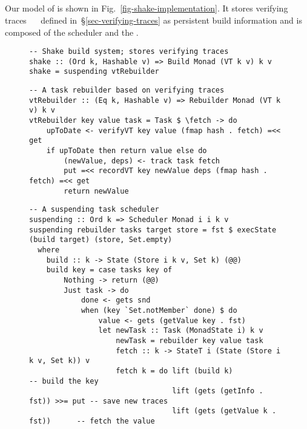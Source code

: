 \vspace{-1mm}
\subsection{\Shake}\label{sec-implementation-shake}
\vspace{-1mm}

Our model of \Shake is shown in Fig.~\ref{fig-shake-implementation}. It stores
verifying traces ~~ defined in~\S\ref{sec-verifying-traces}
as persistent build information and is composed of the  scheduler
and the .

\begin{figure}
\begin{verbatim}
-- Shake build system; stores verifying traces
shake :: (Ord k, Hashable v) => Build Monad (VT k v) k v
shake = suspending vtRebuilder
\end{verbatim}
\vspace{0mm}
\begin{verbatim}
-- A task rebuilder based on verifying traces
vtRebuilder :: (Eq k, Hashable v) => Rebuilder Monad (VT k v) k v
vtRebuilder key value task = Task $ \fetch -> do
    upToDate <- verifyVT key value (fmap hash . fetch) =<< get
    if upToDate then return value else do
        (newValue, deps) <- track task fetch
        put =<< recordVT key newValue deps (fmap hash . fetch) =<< get
        return newValue
\end{verbatim}
\vspace{0mm}
\begin{verbatim}
-- A suspending task scheduler
suspending :: Ord k => Scheduler Monad i i k v
suspending rebuilder tasks target store = fst $ execState (build target) (store, Set.empty)
  where
    build :: k -> State (Store i k v, Set k) (@@)
    build key = case tasks key of
        Nothing -> return (@@)
        Just task -> do
            done <- gets snd
            when (key `Set.notMember` done) $ do
                value <- gets (getValue key . fst)
                let newTask :: Task (MonadState i) k v
                    newTask = rebuilder key value task
                    fetch :: k -> StateT i (State (Store i k v, Set k)) v
                    fetch k = do lift (build k)                      -- build the key
                                 lift (gets (getInfo . fst)) >>= put -- save new traces
                                 lift (gets (getValue k . fst))      -- fetch the value

\end{verbatim}
\end{figure}
